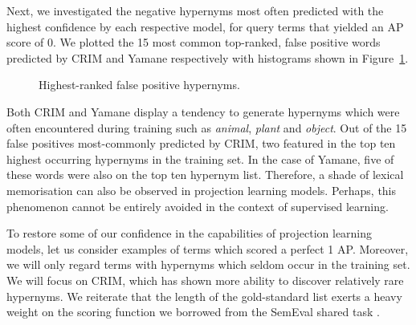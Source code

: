 Next, we investigated the negative hypernyms most often predicted with the highest confidence by each respective model, for query terms that yielded an \ac{AP} score of 0.  We plotted the 15 most common top-ranked, false positive words predicted by CRIM and Yamane respectively with histograms shown in Figure~\ref{fig:false_positive_crim_yamane}.
\begin{figure}[!ht]
    \centering
    \qquad
    \caption{Highest-ranked false positive hypernyms.}        
    \label{fig:false_positive_crim_yamane}
\end{figure}
Both CRIM and Yamane display a tendency to generate hypernyms which were often encountered during training such as \textit{animal}, \textit{plant} and \textit{object}.  Out of the 15 false positives most-commonly predicted by CRIM, two featured in the top ten highest occurring hypernyms in the training set. In the case of Yamane, five of these words were also on the top ten hypernym list.  Therefore, a shade of lexical memorisation can also be observed in projection learning models.  Perhaps, this phenomenon cannot be entirely avoided in the context of supervised learning.  

To restore some of our confidence in the capabilities of projection learning models, let us consider examples of terms which scored a perfect 1 \ac{AP}.  Moreover, we will only regard terms with hypernyms which seldom occur in the training set.  We will focus on CRIM, which has shown more ability to discover relatively rare hypernyms.  We reiterate that the length of the gold-standard list exerts a heavy weight on the scoring function we borrowed from the SemEval shared task \citep{camacho2018semeval}.  

